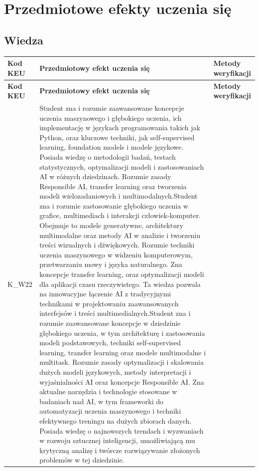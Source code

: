 \documentclass[12pt, a4paper]{article}
\newcommand{\thdrule}{\noalign{\global\setlength{\extrarowheight}{0pt}}}
\newcommand{\thdend}{\noalign{\global\setlength{\extrarowheight}{3pt}}}
\begin{document}
\section{Przedmiotowe efekty uczenia się}

\subsection*{Wiedza}
{\scriptsize
\begin{longtable}{m{1.6cm}m{9.0cm}m{4.2cm}}
\thdrule\toprule
\rowcolor{pjatkRed} {\color{white}\footnotesize\textbf{\vphantom{Ag}Kod KEU}} & {\color{white}\footnotesize\textbf{\vphantom{Ag}Przedmiotowy efekt uczenia się}} & {\color{white}\footnotesize\textbf{\vphantom{Ag}Metody weryfikacji}} \\
\midrule\thdend
\endfirsthead
\thdrule\toprule
\rowcolor{pjatkRed} {\color{white}\footnotesize\textbf{\vphantom{Ag}Kod KEU}} & {\color{white}\footnotesize\textbf{\vphantom{Ag}Przedmiotowy efekt uczenia się}} & {\color{white}\footnotesize\textbf{\vphantom{Ag}Metody weryfikacji}} \\
\midrule\thdend
\endhead
  \rowcolor{tableRowLight} K\_W22 & Student zna i rozumie zaawansowane koncepcje uczenia maszynowego i głębokiego uczenia, ich implementację w językach programowania takich jak Python, oraz kluczowe techniki, jak self-supervised learning, foundation models i modele językowe. Posiada wiedzę o metodologii badań, testach statystycznych, optymalizacji modeli i zastosowaniach AI w różnych dziedzinach. Rozumie zasady Responsible AI, transfer learning oraz tworzenia modeli wielozadaniowych i multimodalnych.Student zna i rozumie zastosowanie głębokiego uczenia w grafice, multimediach i interakcji człowiek-komputer. Obejmuje to modele generatywne, architektury multimodalne oraz metody AI w analizie i tworzeniu treści wizualnych i dźwiękowych. Rozumie techniki uczenia maszynowego w widzeniu komputerowym, przetwarzaniu mowy i języka naturalnego. Zna koncepcje transfer learning, oraz optymalizacji modeli dla aplikacji czasu rzeczywistego. Ta wiedza pozwala na innowacyjne łączenie AI z tradycyjnymi technikami w projektowaniu zaawansowanych interfejsów i treści multimedialnych.Student zna i rozumie zaawansowane koncepcje w dziedzinie głębokiego uczenia, w tym architekturę i zastosowania modeli podstawowych, techniki self-supervised learning, transfer learning oraz modele multimodalne i multitask. Rozumie zasady optymalizacji i skalowania dużych modeli językowych, metody interpretacji i wyjaśnialności AI oraz koncepcje Responsible AI. Zna aktualne narzędzia i technologie stosowane w badaniach nad AI, w tym frameworki do automatyzacji uczenia maszynowego i techniki efektywnego treningu na dużych zbiorach danych. Posiada wiedzę o najnowszych trendach i wyzwaniach w rozwoju sztucznej inteligencji, umożliwiającą mu krytyczną analizę i twórcze rozwiązywanie złożonych problemów w tej dziedzinie. &  \\
\bottomrule
\end{longtable}}
\end{document}
